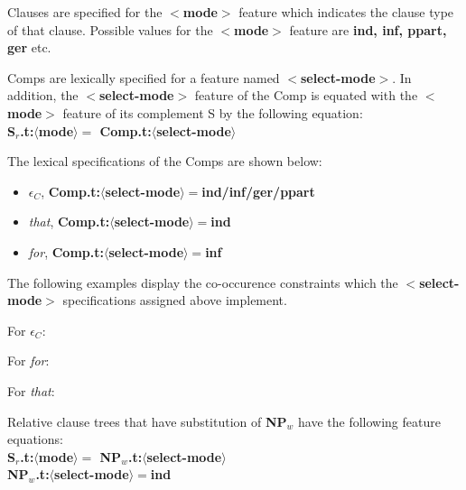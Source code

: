 Clauses are specified for the {\bf $<$mode$>$} feature which indicates
the clause type of that clause. Possible values for the {\bf $<$mode$>$}
feature are {\bf ind, inf, ppart, ger} etc. 

Comps are lexically specified for a feature named {\bf $<$select-mode$>$}.
In addition, the {\bf $<$select-mode$>$} feature of the Comp is 
equated with the  {\bf $<$mode$>$} feature of its complement S by the following equation:\\
{\bf S$_{r}$.t:$\langle$mode$\rangle =$ Comp.t:$\langle$select-mode$\rangle$}

The lexical specifications of the Comps are shown below:
\begin{itemize}
\item $\epsilon$$_{C}$, {\bf Comp.t:$\langle$select-mode$\rangle 
=$ind/inf/ger/ppart}
\item {\em that}, {\bf Comp.t:$\langle$select-mode$\rangle =$ind}
\item {\em for}, {\bf Comp.t:$\langle$select-mode$\rangle =$inf}
\end{itemize}

The following examples display the co-occurence constraints which 
the {\bf $<$select-mode$>$} specifications assigned above implement.

For $\epsilon$$_{C}$:

For {\em for}:

For {\em that}:

Relative clause trees that have substitution of {\bf NP$_{w}$} have
the following feature equations:\\
{\bf S$_{r}$.t:$\langle$mode$\rangle =$ NP$_{w}$.t:$\langle$select-mode$\rangle$}\\
{\bf NP$_{w}$.t:$\langle$select-mode$\rangle =$ind}

